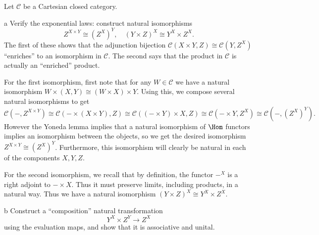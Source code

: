 \documentclass[11pt,letterpaper]{article}
\def\CC{\mathcal{C}}
\begin{document}
\begin{solution}
    Let $\CC$ be a Cartesian closed category.

    \begin{partproblem}{a}
        Verify the exponential laws: construct natural isomorphisms
        \[
            Z^{X\times Y}\cong (Z^X)^Y,\quad (Y\times Z)^X\cong Y^X\times Z^X
        .\] 
        The first of these shows that the adjunction bijection $\CC(X\times Y, Z)\cong \CC(Y, Z^X)$ ``enriches'' to an isomorphism in $\CC$. The second says that the product in $\CC$ is actually an ``enriched'' product. 
    \end{partproblem}

    \begin{solution}
        \quad For the first isomorphism, first note that for any $W\in \CC$ we have a natural isomorphism $W\times (X,Y) \cong (W\times X)\times Y$. Using this, we compose several natural isomorphisms to get 
        \[
            \CC(-, Z^{X\times Y}) \cong \CC(-\times (X\times Y), Z) \cong \CC((-\times Y)\times X, Z) \cong \CC(-\times Y, Z^X) \cong \CC(-, (Z^X)^Y)
        .\]
        However the Yoneda lemma implies that a natural isomorphism of $\Hom$ functors implies an isomorphism between the objects, so we get the desired isomorphism $Z^{X\times Y} \cong (Z^X)^Y$. Furthermore, this isomorphism will clearly be natural in each of the components $X,Y,Z$.
        
        \quad For the second isomorphism, we recall that by definition, the functor $-^X$ is a right adjoint to $-\times X$. Thus it must preserve limits, including products, in a natural way. Thus we have a natural isomorphism $(Y\times Z)^X \cong Y^X\times Z^X$. 
    \end{solution}

    \begin{partproblem}{b}
        Construct a ``composition'' natural transformation
        \[
            Y^X\times Z^Y \to Z^X
        \]
        using the evaluation maps, and show that it is associative and unital. 
    \end{partproblem}


\end{solution}
\end{document}
